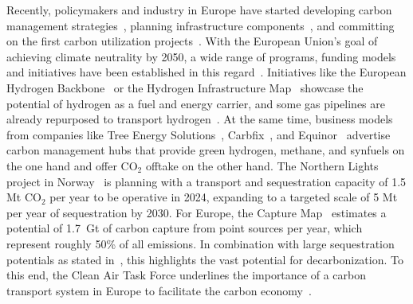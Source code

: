 \documentclass[twocolumn]{article}
\newcommand{\carbon}{CO$_2$}
\begin{document}
Recently, policymakers and industry in Europe have started developing carbon management strategies~\cite{GermanyDevelopingStrategy2023,CarbonManagementStrategie}, planning infrastructure components~\cite{CONetz}, and committing on the first carbon utilization projects~\cite{EFuelsPilotPlant2022,OrstedAssumesFull,GROUNDBREAKINGEFUELPRODUCTION,DLREfuelsDLR}. With the European Union's goal of achieving climate neutrality by 2050, a wide range of programs, funding models and initiatives have been established in this regard~\cite{eu2023netzero,europeangreendeal,europeaninnovationfund}. Initiatives like the European Hydrogen Backbone~\cite{gasforclimateEuropeanHydrogenBackbone2022} or the Hydrogen Infrastructure Map~\cite{H2InfrastructureMap} showcase the potential of hydrogen as a fuel and energy carrier, and some gas pipelines are already repurposed to transport hydrogen~\cite{RohrFreiFuer}. At the same time, business models from companies like Tree Energy Solutions~\cite{TESHydrogenLife2023}, Carbfix~\cite{WeTurnCO2}, and Equinor~\cite{adomaitisEquinorRWEBuild2023} advertise carbon management hubs that provide green hydrogen, methane, and synfuels on the one hand and offer \carbon{} offtake on the other hand. The Northern Lights project in Norway~\cite{NorthernLightsWhat} is planning with a transport and sequestration capacity of 1.5 Mt \carbon{} per year  to be operative in 2024, expanding to a targeted scale of 5 Mt per year of sequestration by 2030.
For Europe, the Capture Map~\cite{ToolsGreenTransition} estimates a potential of 1.7~Gt of carbon capture from point sources per year, which represent roughly 50\% of all emissions. In combination with large sequestration potentials as stated in~\cite{weiProposedGlobalLayout2021}, this highlights the vast potential for decarbonization.
To this end, the Clean Air Task Force underlines the importance of a carbon transport system in Europe to facilitate the carbon economy~\cite{lockwoodEuropeanStrategyCarbon}.
\end{document}
